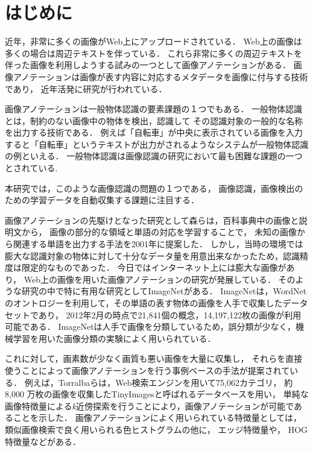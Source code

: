 \chapter{はじめに}

近年，非常に多くの画像がWeb上にアップロードされている．
Web上の画像は多くの場合は周辺テキストを伴っている．
これら非常に多くの周辺テキストを伴った画像を利用しようする試みの一つとして画像アノテーションがある．
画像アノテーションは画像が表す内容に対応するメタデータを画像に付与する技術であり，
近年活発に研究が行われている\cite{jeon,watanabe}．

画像アノテーションは一般物体認識の要素課題の１つでもある．
一般物体認識とは，制約のない画像中の物体を検出，認識して
その認識対象の一般的な名称を出力する技術である．
例えば「自転車」が中央に表示されている画像を入力すると「自転車」というテキストが出力がされるようなシステムが一般物体認識の例といえる．
一般物体認識は画像認識の研究において最も困難な課題の一つとされている\cite{yanai}.

%
本研究では，このような画像認識の問題の１つである，
画像認識，画像検出のための学習データを自動収集する課題に注目する．

画像アノテーションの先駆けとなった研究として森ら\cite{mori}は，百科事典中の画像と説明文から，
画像の部分的な領域と単語の対応を学習することで，
未知の画像から関連する単語を出力する手法を2001年に提案した．
しかし，当時の環境では膨大な認識対象の物体に対して十分なデータ量を用意出来なかったため，認識精度は限定的なものであった．
今日ではインターネット上には膨大な画像があり，
Web上の画像を用いた画像アノテーションの研究が発展している．
そのような研究の中で特に有用な研究としてImageNet\cite{imagenet}がある．
ImageNet\cite{imagenet}は，WordNetのオントロジーを利用して，その単語の表す物体の画像を人手で収集したデータセットであり，
2012年2月の時点で21,841個の概念，14,197,122枚の画像が利用可能である．
ImageNetは人手で画像を分類しているため，誤分類が少なく，機械学習を用いた画像分類の実験によく用いられている． 

これに対して，画素数が少なく画質も悪い画像を大量に収集し，
それらを直接使うことによって画像アノテーションを行う事例ベースの手法が提案されている．
例えば，Torralba\cite{torralba}らは，Web検索エンジンを用いて75,062カテゴリ，
約8,000 万枚の画像を収集したTinyImagesと呼ばれるデータベースを用い，
単純な画像特徴量による{\it k}近傍探索を行うことにより，画像アノテーションが可能であることを示した．
%
画像アノテーションによく用いられている特徴量としては，
類似画像検索で良く用いられる色ヒストグラムの他に，
エッジ特徴量や，
HOG特徴量\cite{dalal}などがある．

